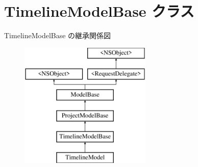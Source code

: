 \hypertarget{interface_timeline_model_base}{}\section{Timeline\+Model\+Base クラス}
\label{interface_timeline_model_base}
Timeline\+Model\+Base の継承関係図\begin{figure}[H]
\begin{center}
\leavevmode
\includegraphics[height=6.000000cm]{interface_timeline_model_base}
\end{center}
\end{figure}
